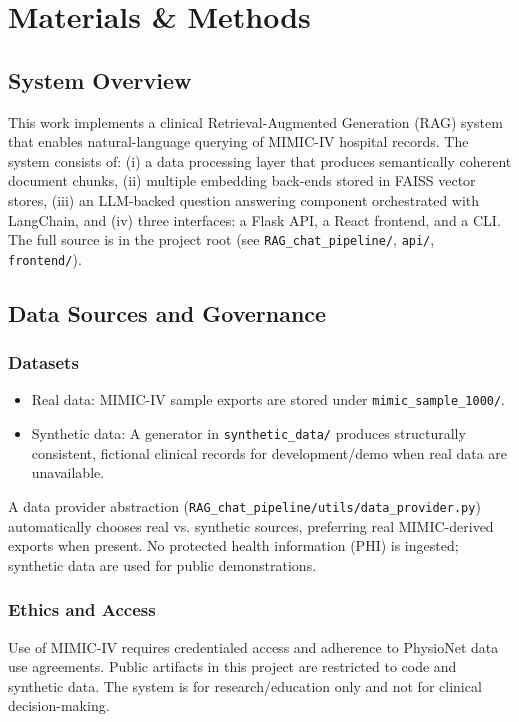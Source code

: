 \chapter{Materials \& Methods}

\section{System Overview}
This work implements a clinical Retrieval-Augmented Generation (RAG) system that enables natural-language querying of MIMIC-IV hospital records. The system consists of: (i) a data processing layer that produces semantically coherent document chunks, (ii) multiple embedding back-ends stored in FAISS vector stores, (iii) an LLM-backed question answering component orchestrated with LangChain, and (iv) three interfaces: a Flask API, a React frontend, and a CLI. The full source is in the project root (see \texttt{RAG\_chat\_pipeline/}, \texttt{api/}, \texttt{frontend/}).

\section{Data Sources and Governance}
\subsection{Datasets}
\begin{itemize}
  \item Real data: MIMIC-IV sample exports are stored under \texttt{mimic\_sample\_1000/}.
  \item Synthetic data: A generator in \texttt{synthetic\_data/} produces structurally consistent, fictional clinical records for development/demo when real data are unavailable.
\end{itemize}
\noindent A data provider abstraction (\texttt{RAG\_chat\_pipeline/utils/data\_provider.py}) automatically chooses real vs. synthetic sources, preferring real MIMIC-derived exports when present. No protected health information (PHI) is ingested; synthetic data are used for public demonstrations.

\subsection{Ethics and Access}
Use of MIMIC-IV requires credentialed access and adherence to PhysioNet data use agreements. Public artifacts in this project are restricted to code and synthetic data. The system is for research/education only and not for clinical decision-making.

